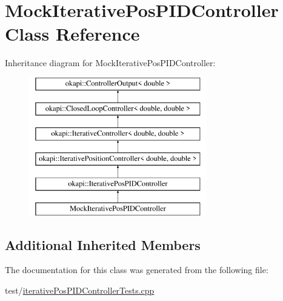 \hypertarget{classMockIterativePosPIDController}{}\section{Mock\+Iterative\+Pos\+P\+I\+D\+Controller Class Reference}
\label{classMockIterativePosPIDController}
Inheritance diagram for Mock\+Iterative\+Pos\+P\+I\+D\+Controller\+:\begin{figure}[H]
\begin{center}
\leavevmode
\includegraphics[height=6.000000cm]{classMockIterativePosPIDController}
\end{center}
\end{figure}
\subsection*{Additional Inherited Members}


The documentation for this class was generated from the following file\+:\begin{DoxyCompactItemize}
\item 
test/\mbox{\hyperlink{iterativePosPIDControllerTests_8cpp}{iterative\+Pos\+P\+I\+D\+Controller\+Tests.\+cpp}}\end{DoxyCompactItemize}
